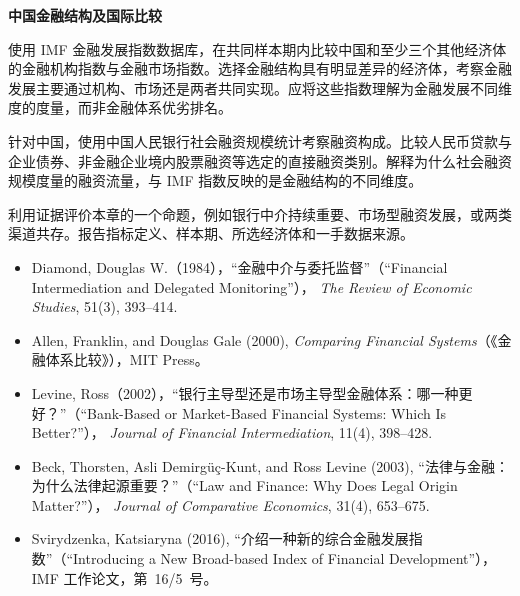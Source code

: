 

\textbf{中国金融结构及国际比较}

使用 IMF 金融发展指数数据库，在共同样本期内比较中国和至少三个其他经济体的金融机构指数与金融市场指数。选择金融结构具有明显差异的经济体，考察金融发展主要通过机构、市场还是两者共同实现。应将这些指数理解为金融发展不同维度的度量，而非金融体系优劣排名。

针对中国，使用中国人民银行社会融资规模统计考察融资构成。比较人民币贷款与企业债券、非金融企业境内股票融资等选定的直接融资类别。解释为什么社会融资规模度量的融资流量，与 IMF 指数反映的是金融结构的不同维度。

利用证据评价本章的一个命题，例如银行中介持续重要、市场型融资发展，或两类渠道共存。报告指标定义、样本期、所选经济体和一手数据来源。



\begin{itemize}

\item Diamond, Douglas W.（1984），“金融中介与委托监督”（``Financial Intermediation and Delegated Monitoring''），
\emph{The Review of Economic Studies}, 51(3), 393--414.

\item Allen, Franklin, and Douglas Gale (2000), 
\emph{Comparing Financial Systems}（《金融体系比较》），MIT Press。

\item Levine, Ross（2002），“银行主导型还是市场主导型金融体系：哪一种更好？”（``Bank-Based or Market-Based Financial Systems: Which Is Better?''），
\emph{Journal of Financial Intermediation}, 11(4), 398--428.

\item Beck, Thorsten, Asli Demirg\"{u}\c{c}-Kunt, and Ross Levine (2003), 
“法律与金融：为什么法律起源重要？”（``Law and Finance: Why Does Legal Origin Matter?''），
\emph{Journal of Comparative Economics}, 31(4), 653--675.

\item Svirydzenka, Katsiaryna (2016), 
“介绍一种新的综合金融发展指数”（``Introducing a New Broad-based Index of Financial Development''），
IMF 工作论文，第~16/5~号。

\end{itemize}

